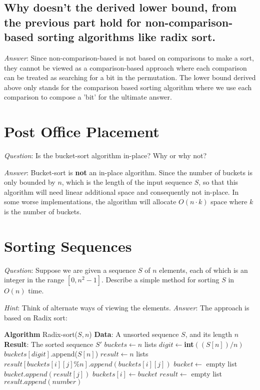 \documentclass[11pt]{article}
\begin{document}
\subsection{Why doesn't the derived lower bound, from the previous part hold for non-comparison-based sorting algorithms like radix sort.}
\noindent \emph{Answer}: Since non-comparison-based is not based on comparisons to make a sort, they cannot be viewed as a comparison-based approach where each comparison can be treated as searching for a bit in the permutation. The lower bound derived above only stands for the comparison based sorting algorithm where we use each comparison to compose a 'bit' for the ultimate answer.
\section{Post Office Placement}
\noindent \emph{Question}: Is the bucket-sort algorithm in-place? Why or why not?

\noindent \emph{Answer}: Bucket-sort is \textbf{not} an in-place algorithm. Since the number of buckets is only bounded by $n$, which is the length of the input sequence $S$, so that this algorithm will need linear additional space and consequently not in-place. In some worse implementations, the algorithm will allocate $O(n\cdot k)$ space where $k$ is the number of buckets.
\section{Sorting Sequences}
\noindent \emph{Question}: Suppose we are given a sequence $S$ of $n$ elements, each of which is an integer in the range $[0,n^2-1]$. Describe a simple method for sorting $S$ in $O(n)$ time.

\noindent \emph{Hint}: Think of alternate ways of viewing the elements.
\noindent \emph{Answer}: The approach is based on Radix sort:
\begin{algorithmic}
	\State \textbf{Algorithm} Radix-sort($S,n$)
	\State \textbf{Data}: A unsorted sequence $S$, and its length $n$
	\State \textbf{Result}: The sorted sequence $S'$
	\State $buckets \gets n $ lists
		\State $digit \gets $\textbf{int}$((S[n])/n)$
		\State $buckets[digit]$.append($S[n]$)
	\EndFor
		\State $result\gets n$ lists
			\State $result[buckets[i][j]\%n].append(buckets[i][j])$
		\EndFor
		\State $bucket\gets$ empty list
			\State $bucket.append(result[j])$
		\EndFor
		\State $buckets[i]\gets bucket$
	\EndFor
	\State $result \gets$ empty list
			\State $result.append(number)$
		\EndFor
	\EndFor
\end{algorithmic}
\end{document}
